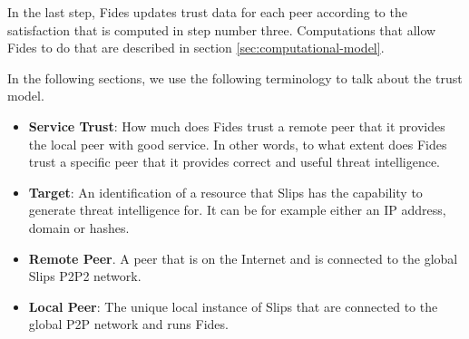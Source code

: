In the last step, Fides updates trust data for each peer according to the satisfaction that is computed in step number three.
Computations that allow Fides to do that are described in section \ref{sec:computational-model}.

\vspace{1.5cm}

\noindent
In the following sections, we use the following terminology to talk about the trust model.

\begin{itemize}
\item \textbf{Service Trust}: How much does Fides trust a remote peer that it provides the local peer with good service. In other words, to what extent does Fides trust a specific peer that it provides correct and useful threat intelligence.

\item \textbf{Target}: An identification of a resource that Slips has the capability to generate threat intelligence for. It can be for example either an IP address, domain or hashes.

\item \textbf{Remote Peer}. A peer that is on the Internet and is connected to the global Slips P2P2 network.

\item \textbf{Local Peer}: The unique local instance of Slips that are connected to the global P2P network and runs Fides.
\end{itemize}










